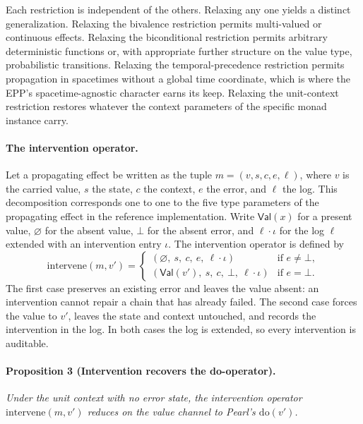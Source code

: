 Each restriction is independent of the others. Relaxing any one yields a distinct generalization. Relaxing the bivalence restriction permits multi-valued or continuous effects. Relaxing the biconditional restriction permits arbitrary deterministic functions or, with appropriate further structure on the value type, probabilistic transitions. Relaxing the temporal-precedence restriction permits propagation in spacetimes without a global time coordinate, which is where the EPP's spacetime-agnostic character earns its keep. Relaxing the unit-context restriction restores whatever the context parameters of the specific monad instance carry.

\paragraph{The intervention operator.}
Let a propagating effect be written as the tuple $m = (v, s, c, e, \ell)$, where $v$ is the carried value, $s$ the state, $c$ the context, $e$ the error, and $\ell$ the log. This decomposition corresponds one to one to the five type parameters of the propagating effect in the reference implementation. Write $\mathsf{Val}(x)$ for a present value, $\varnothing$ for the absent value, $\bot$ for the absent error, and $\ell \cdot \iota$ for the log $\ell$ extended with an intervention entry $\iota$. The intervention operator is defined by
\[
\mathrm{intervene}(m, v') =
\begin{cases}
(\varnothing,\ s,\ c,\ e,\ \ell \cdot \iota) & \text{if } e \neq \bot, \\[4pt]
(\mathsf{Val}(v'),\ s,\ c,\ \bot,\ \ell \cdot \iota) & \text{if } e = \bot.
\end{cases}
\]
The first case preserves an existing error and leaves the value absent: an intervention cannot repair a chain that has already failed. The second case forces the value to $v'$, leaves the state and context untouched, and records the intervention in the log. In both cases the log is extended, so every intervention is auditable.

\paragraph{Proposition 3 (Intervention recovers the do-operator).}
\emph{Under the unit context with no error state, the intervention operator $\mathrm{intervene}(m, v')$ reduces on the value channel to Pearl's $\mathrm{do}(v')$.}

